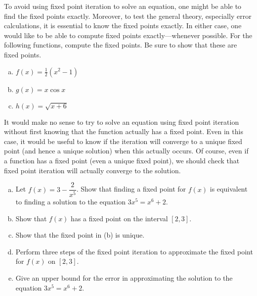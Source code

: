 \documentclass[11pt,letterpaper]{article}
\begin{document}


 To avoid using fixed point iteration to solve an equation, one might be able to find the fixed points exactly. Moreover, to test the general theory, especially error calculations, it is essential to know the fixed points exactly. In either case, one would like to be able to compute fixed points exactly---whenever possible. For the following functions, compute the fixed points. Be sure to show that these are fixed points.
	\begin{enumerate}[(a)]
	\item $f(x)= \frac{1}{2}(x^2 - 1)$
	\item $g(x)= x \cos x$
	\item $h(x)= \sqrt{x + 6}$
	\end{enumerate}



\newpage



 It would make no sense to try to solve an equation using fixed point iteration without first knowing that the function actually has a fixed point. Even in this case, it would be useful to know if the iteration will converge to a unique fixed point (and hence a unique solution) when this actually occurs. Of course, even if a function has a fixed point (even a unique fixed point), we should check that fixed point iteration will actually converge to the solution.  
	\begin{enumerate}[(a)]
	\item Let $f(x)= 3 - \dfrac{2}{x^5}$. Show that finding a fixed point for $f(x)$ is equivalent to finding a solution to the equation $3x^5= x^6 + 2$. 
	\item Show that $f(x)$ has a fixed point on the interval $[2, 3]$.
	\item Show that the fixed point in (b) is unique. 
	\item Perform three steps of the fixed point iteration to approximate the fixed point for $f(x)$ on $[2, 3]$. 
	\item Give an upper bound for the error in approximating the solution to the equation $3x^5= x^6 + 2$. 
	\end{enumerate}
\end{document}
